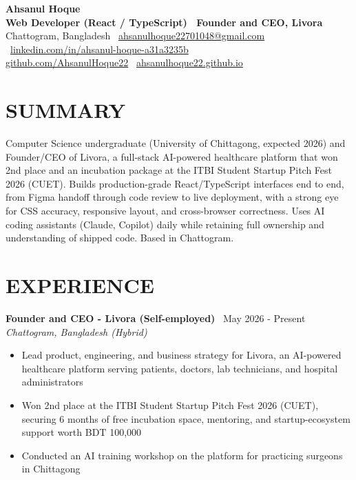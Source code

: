 \documentclass[10.5pt,a4paper]{article}
\newenvironment{tightitemize}{
  \begin{itemize}[leftmargin=15pt, itemsep=1pt, parsep=0pt, topsep=2pt]
}{
  \end{itemize}
}
\newcommand{\entry}[3]{%
  \textbf{#1} \textbar\ #2\\
  \textit{#3}%
}
\begin{document}
{\huge \bfseries Ahsanul Hoque}\\[2pt]
{\bfseries Web Developer (React / TypeScript) \textbar\ Founder and CEO, Livora}\\[5pt]
{\small
  Chattogram, Bangladesh \textbar\
  \href{mailto:ahsanulhoque22701048@gmail.com}{ahsanulhoque22701048@gmail.com} \textbar\
  \href{https://linkedin.com/in/ahsanul-hoque-a31a3235b}{linkedin.com/in/ahsanul-hoque-a31a3235b} \textbar\\
  \href{https://github.com/AhsanulHoque22}{github.com/AhsanulHoque22} \textbar\
  \href{https://ahsanulhoque22.github.io}{ahsanulhoque22.github.io}
}

\section*{SUMMARY}
Computer Science undergraduate (University of Chittagong, expected 2026) and Founder/CEO of Livora, a full-stack AI-powered healthcare platform that won 2nd place and an incubation package at the ITBI Student Startup Pitch Fest 2026 (CUET). Builds production-grade React/TypeScript interfaces end to end, from Figma handoff through code review to live deployment, with a strong eye for CSS accuracy, responsive layout, and cross-browser correctness. Uses AI coding assistants (Claude, Copilot) daily while retaining full ownership and understanding of shipped code. Based in Chattogram.

\section*{EXPERIENCE}

\entry{Founder and CEO - Livora (Self-employed)}{May 2026 - Present}{Chattogram, Bangladesh (Hybrid)}
\begin{tightitemize}
  \item Lead product, engineering, and business strategy for Livora, an AI-powered healthcare platform serving patients, doctors, lab technicians, and hospital administrators
  \item Won 2nd place at the ITBI Student Startup Pitch Fest 2026 (CUET), securing 6 months of free incubation space, mentoring, and startup-ecosystem support worth BDT 100,000
  \item Conducted an AI training workshop on the platform for practicing surgeons in Chittagong
\end{tightitemize}
\end{document}
